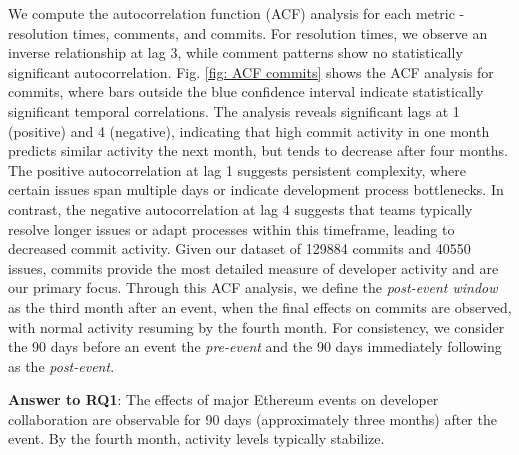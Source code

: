 We compute the autocorrelation function (ACF) analysis for each metric - resolution times, comments, and commits. For resolution times, we observe an inverse relationship at lag 3, while comment patterns show no statistically significant autocorrelation. 
Fig. \ref{fig: ACF commits} shows the ACF analysis for commits, where bars outside the blue confidence interval indicate statistically significant temporal correlations. The analysis reveals significant lags at 1 (positive) and 4 (negative), indicating that high commit activity in one month predicts similar activity the next month, but tends to decrease after four months. The positive autocorrelation at lag 1 suggests persistent complexity, where certain issues span multiple days or indicate development process bottlenecks. In contrast, the negative autocorrelation at lag 4 suggests that teams typically resolve longer issues or adapt processes within this timeframe, leading to decreased commit activity.
Given our dataset of 129884 commits and 40550 issues, commits provide the most detailed measure of developer activity and are our primary focus. Through this ACF analysis, we define the \textit{post-event window} as the third month after an event, when the final effects on commits are observed, with normal activity resuming by the fourth month. For consistency, we consider the 90 days before an event the \textit{pre-event} and the 90 days immediately following as the \textit{post-event}.



\begin{tcolorbox}[right=0.1cm,left=0.1cm,top=0.1cm,bottom=0.1cm]
\textbf{Answer to RQ1}: The effects of major Ethereum events on developer collaboration are observable for 90 days (approximately three months) after the event. By the fourth month, activity levels typically stabilize. 
\end{tcolorbox}